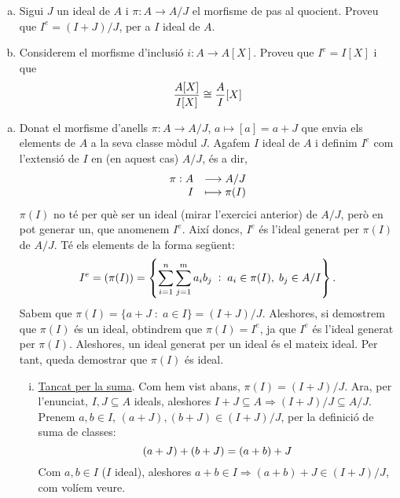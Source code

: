 \documentclass[../main.tex]{subfiles}
\begin{document}
\begin{exercici}
\label{esal20}
\begin{enumerate}[(a)]
    \item Sigui $J$ un ideal de $A$ i $\pi:A\rightarrow A/J$ el morfisme de pas al quocient. Proveu que $I^{e} = (I+J)/J$, per a $I$ ideal de $A$.
    \item Considerem el morfisme d'inclusió $i:A\rightarrow A[X]$. Proveu que $I^{e} = I[X]$ i que
    \begin{equation}
        \notag
        \frac{A[X]}{I[X]}\cong \frac{A}{I}[X]
    \end{equation}
\end{enumerate}
\end{exercici}
\begin{sol}
\begin{enumerate}[(a)]
    \item Donat el morfisme d'anells $\pi:A\rightarrow A/J$, $a\mapsto [a] = a+J$ que envia els elements de $A$ a la seva classe mòdul $J$. Agafem $I$ ideal de $A$ i definim $I^{e}$ com l'extensió de $I$ en (en aquest cas) $A/J$, és a dir, 
    \begin{equation}
        \notag
        \begin{array}{rl}
            \pi:A &  \longrightarrow A/J\\
            I & \longmapsto \pi(I)
        \end{array}
    \end{equation}
    $\pi(I)$ no té per què ser un ideal (mirar l'exercici anterior) de $A/J$, però en pot generar un, que anomenem $I^{e}$. Així doncs, $I^{e}$ és l'ideal generat per $\pi(I)$ de $A/J$. Té els elements de la forma següent:
    \begin{equation}
        \notag
        I^{e} = (\pi(I)) = \left\{\sum_{i=1}^n\sum_{j=1}^m a_ib_j\;:\;a_i\in \pi(I),\;b_j\in A/I\right\}.
    \end{equation}
    Sabem que $\pi(I) = \{a+J\;:\;a\in I\} = (I+J)/J$. Aleshores, si demostrem que $\pi(I)$ és un ideal, obtindrem que $\pi(I) = I^{e}$, ja que $I^{e}$ és l'ideal generat per $\pi(I)$. Aleshores, un ideal generat per un ideal és el mateix ideal. Per tant, queda demostrar que $\pi(I)$ és ideal.
    \begin{enumerate}[(i)]
        \item \underline{Tancat per la suma}. Com hem vist abans, $\pi(I) = (I+J)/J$. Ara, per l'enunciat, $I,J\subseteq A$ ideals, aleshores $I+J\subseteq A \Rightarrow (I+J)/J\subseteq A/J$. Prenem $a,b\in I$, $(a+J),(b+J)\in (I+J)/J$, per la definició de suma de classes:
        \begin{equation}
            \notag
            (a+J) + (b+J) = (a+b)+J
        \end{equation}
        Com $a,b\in I$ ($I$ ideal), aleshores $a+b\in I\Rightarrow (a+b)+J\in (I+J)/J$, com volíem veure.
        

\end{enumerate}
\end{enumerate}
\end{sol}
\end{document}
